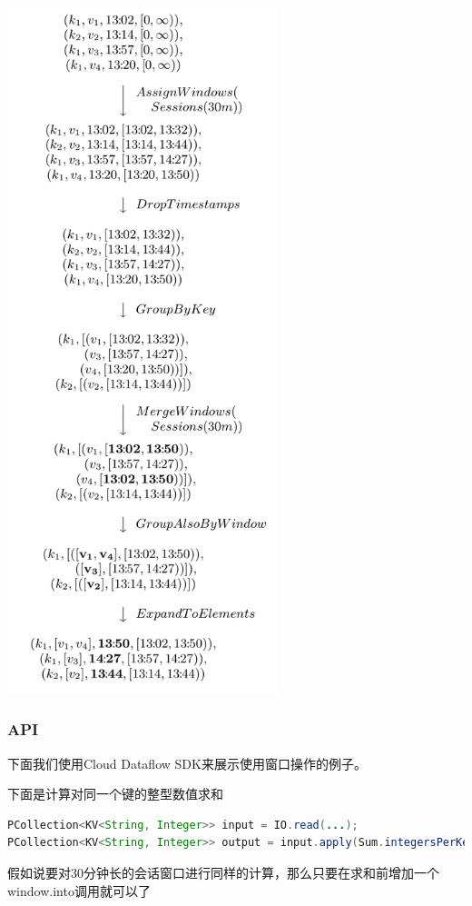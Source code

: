 \documentclass[oneside]{ctexbook}
\begin{document}
\noindent \includegraphics[height=20cm]{windowmerging.png}

\subsubsection{API}

下面我们使用Cloud Dataflow SDK来展示使用窗口操作的例子。

下面是计算对同一个键的整型数值求和

\begin{lstlisting}[language=java]
PCollection<KV<String, Integer>> input = IO.read(...);
PCollection<KV<String, Integer>> output = input.apply(Sum.integersPerKey());
\end{lstlisting}

假如说要对30分钟长的会话窗口进行同样的计算，那么只要在求和前增加一个window.into调用就可以了
\end{document}
